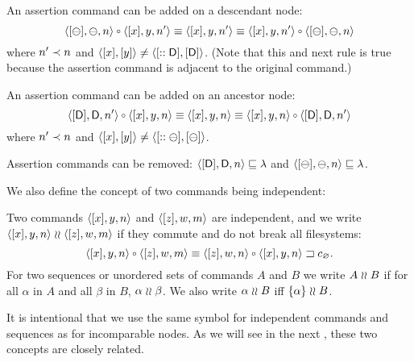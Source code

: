 \begin{myax}
An assertion command can be added on a descendant node:
\[ \cbba{n}\cc\cxynnv \equiv \cxynnv \equiv \cxynnv\cc\cbba{n} \] 
where $n'\prec n$ and $\langle{[x],[y]}\rangle\neq\langle{[::\mathsf{D}],[\mathsf{D}]}\rangle$.
(Note that this and next rule is true because the assertion command is
adjacent to the original command.)
\end{myax}

\begin{myax}
An assertion command can be added on an ancestor node:
\[ \cdda{\nn}\cc\cxynv \equiv \cxynv \equiv \cxynv\cc\cdda{\nn} \]
where $n'\prec n$ and $\langle{[x],[y]}\rangle\neq\langle{[::\ominus],[\ominus]}\rangle$.
\end{myax}

\begin{myax}
Assertion commands can be removed:
$\langle{[\mathsf{D}],\mathsf{D},n}\rangle\sqsubseteq\lambda$ and $\langle{[\ominus],\ominus,n}\rangle\sqsubseteq\lambda$.
\end{myax}




\myskip
We also define the concept of two commands being independent:

\begin{mydef}
Two commands $\langle{[x],y,n}\rangle$ and $\langle{[z],w,m}\rangle$ 
are independent, and we write $\langle{[x],y,n}\rangle\mathrel{\wr\wr}\langle{[z],w,m}\rangle$ if 
they commute and do not break all filesystems:
\[ \cxynv\cc\czwmv \equiv \wrksx{\czwnv\cc\cxynv}. \]
For two sequences or unordered sets of commands $A$ and $B$ we write $A\mathrel{\wr\wr} B$ if
for all $\alpha$ in $A$ and all $\beta$ in $B$, $\alpha\mathrel{\wr\wr}\beta$.
We also write $\alpha\mathrel{\wr\wr} B$ iff $\{\alpha\}\mathrel{\wr\wr} B$.
\end{mydef}

It is intentional that we use the same symbol for independent commands
and sequences as for incomparable nodes. As we will see in the next
,
these two concepts are closely related.

